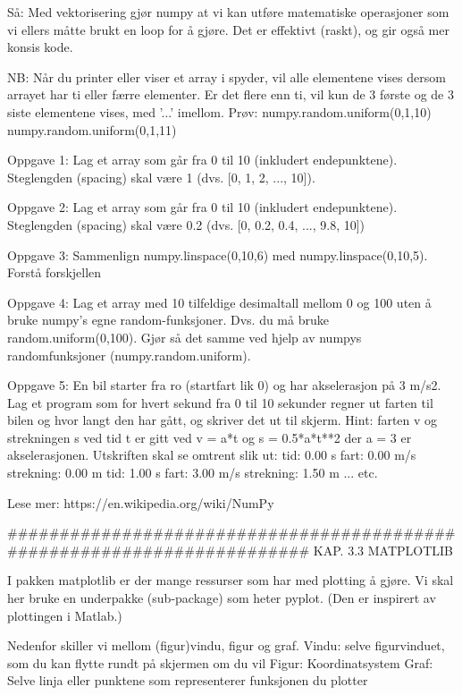 \documentclass[a4paper,11pt,utf8]{book}
\begin{document}
Så: Med vektorisering gjør numpy at vi kan utføre matematiske operasjoner 
som vi ellers måtte brukt en loop for å gjøre. 
Det er effektivt (raskt), og gir også mer konsis kode. 


NB: Når du printer eller viser et array i spyder, vil alle elementene vises dersom arrayet 
har ti eller færre elementer.
Er det flere enn ti, vil kun de 3 første og de 3 siste elementene vises, med '...' imellom.
Prøv: 
numpy.random.uniform(0,1,10)
numpy.random.uniform(0,1,11)



Oppgave 1: Lag et array som går fra 0 til 10 (inkludert endepunktene). 
Steglengden (spacing) skal være 1  (dvs. [0, 1, 2, ..., 10]). 


Oppgave 2: Lag et array som går fra 0 til 10 (inkludert endepunktene). 
Steglengden (spacing) skal være 0.2  (dvs. [0, 0.2, 0.4, ..., 9.8, 10])


Oppgave 3: Sammenlign numpy.linspace(0,10,6) med numpy.linspace(0,10,5). Forstå forskjellen


Oppgave 4: Lag et array med 10 tilfeldige desimaltall mellom 0 og 100 
uten å bruke numpy's egne random-funksjoner. 
Dvs. du må bruke random.uniform(0,100).
Gjør så det samme ved hjelp av numpys randomfunksjoner (numpy.random.uniform).


Oppgave 5: 
En bil starter fra ro (startfart lik 0) og har akselerasjon på 3 m/s2. 
Lag et program som for hvert sekund fra 0 til 10 sekunder regner ut farten til bilen 
og hvor langt den har gått, og skriver det ut til skjerm. 
Hint: farten v og strekningen s ved tid t er gitt ved v = a*t og s = 0.5*a*t**2 der a = 3 er akselerasjonen.
Utskriften skal se omtrent slik ut:
tid:  0.00 s    fart:  0.00 m/s    strekning:   0.00 m
tid:  1.00 s    fart:  3.00 m/s    strekning:   1.50 m
... etc. 


Lese mer: https://en.wikipedia.org/wiki/NumPy



######################################################################## 
KAP. 3.3  MATPLOTLIB

I pakken matplotlib er der mange ressurser som har med plotting å gjøre.
Vi skal her bruke en underpakke (sub-package) som heter pyplot.
(Den er inspirert av plottingen i Matlab.)

Nedenfor skiller vi mellom (figur)vindu, figur og graf. 
  Vindu: selve figurvinduet, som du kan flytte rundt på skjermen om du vil 
  Figur: Koordinatsystem
  Graf:  Selve linja eller punktene som representerer funksjonen du plotter
\end{document}
